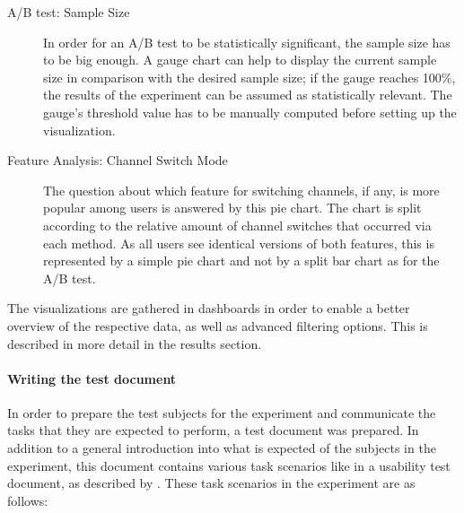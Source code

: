 \begin{description}
\item[A/B test: Sample Size]
In order for an A/B test to be statistically significant, the sample size has to be big enough.
A gauge chart can help to display the current sample size in comparison with the desired sample size; if the gauge reaches 100\%, the results of the experiment can be assumed as statistically relevant.
The gauge's threshold value has to be manually computed before setting up the visualization.

\item[Feature Analysis: Channel Switch Mode] 
The question about which feature for switching channels, if any, is more popular among users is answered by this pie chart.
The chart is split according to the relative amount of channel switches that occurred via each method.
As all users see identical versions of both features, this is represented by a simple pie chart and not by a split bar chart as for the A/B test.

\end{description}

The visualizations are gathered in dashboards in order to enable a better overview of the respective data, as well as advanced filtering options.
This is described in more detail in the results section.




\paragraph{Writing the test document}

In order to prepare the test subjects for the experiment and communicate the tasks that they are expected to perform, a test document was prepared.
In addition to a general introduction into what is expected of the subjects in the experiment, this document contains various task scenarios like in a usability test document, as described by \citet[Prepare Test Materials, pp.~182f]{rubin2008handbook}.
These task scenarios in the experiment are as follows:

